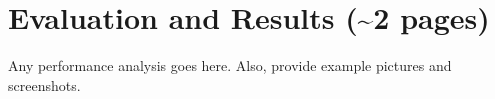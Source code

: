 \section{Evaluation and Results (\textasciitilde 2 pages)}
\label{sec:eval}

Any performance analysis goes here. Also, provide example pictures and screenshots.

